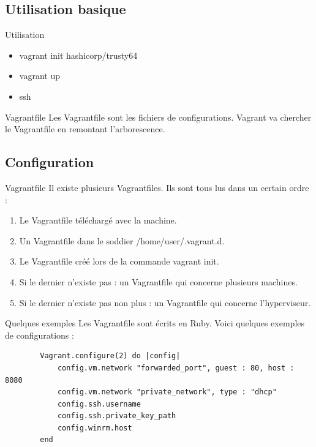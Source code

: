 \documentclass{beamer}
\begin{document}
    \subsection{Utilisation basique}
    \begin{frame}{Utilisation}
        \begin{itemize}
            \item{vagrant init hashicorp/trusty64}
            \item{vagrant up}
            \item{ssh}
        \end{itemize}
        \pause{}
        \begin{block}{Vagrantfile}
            Les Vagrantfile sont les fichiers de configurations. Vagrant va chercher le Vagrantfile en remontant l'arborescence.
        \end{block}
    \end{frame}

    \subsection{Configuration}
    \begin{frame}{Vagrantfile}
        Il existe plusieurs Vagrantfiles. Ils sont tous lus dans un certain ordre :
        \begin{enumerate}
            \item{Le Vagrantfile téléchargé avec la machine.}
            \item{Un Vagrantfile dans le soddier /home/user/.vagrant.d.}
            \item{Le Vagrantfile créé lors de la commande vagrant init.}
            \item{Si le dernier n'existe pas : un Vagrantfile qui concerne plusieurs machines.}
            \item{Si le dernier n'existe pas non plus : un Vagrantfile qui concerne l'hyperviseur.}
        \end{enumerate}
    \end{frame}

    \begin{frame}[containsverbatim]{Quelques exemples}
        Les Vagrantfile sont écrits en Ruby. Voici quelques exemples de configurations :
        \begin{verbatim}
        Vagrant.configure(2) do |config|
            config.vm.network "forwarded_port", guest : 80, host : 8080
            config.vm.network "private_network", type : "dhcp"
            config.ssh.username
            config.ssh.private_key_path
            config.winrm.host
        end
        \end{verbatim}
    \end{frame}
\end{document}
